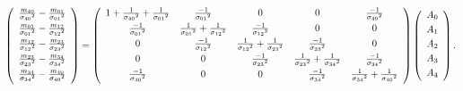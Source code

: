 \documentclass[12pt]{article}
\begin{document}
\begin{equation}
\left(\begin{array}{c}
\frac{m_{40}}{{\sigma_{40}}^2} - \frac{m_{01}}{{\sigma_{01}}^2} \vspace{0.1 cm} \\
\frac{m_{01}}{{\sigma_{01}}^2} - \frac{m_{12}}{{\sigma_{12}}^2} \vspace{0.1 cm} \\
\frac{m_{12}}{{\sigma_{12}}^2} - \frac{m_{23}}{{\sigma_{23}}^2} \vspace{0.1 cm} \\
\frac{m_{23}}{{\sigma_{23}}^2} - \frac{m_{34}}{{\sigma_{34}}^2} \vspace{0.1 cm} \\
\frac{m_{34}}{{\sigma_{34}}^2} - \frac{m_{40}}{{\sigma_{40}}^2} \vspace{0.1 cm} \\
\end{array}\right) = \left(\begin{array}{c c c c c}
1 + \frac{1}{{\sigma_{40}}^2} + \frac{1}{{\sigma_{01}}^2} & \frac{-1}{{\sigma_{01}}^2} & 0 & 0 & \frac{-1}{{\sigma_{40}}^2} \vspace{0.1 cm} \\
\frac{-1}{{\sigma_{01}}^2} & \frac{1}{{\sigma_{01}}^2} + \frac{1}{{\sigma_{12}}^2} & \frac{-1}{{\sigma_{12}}^2} & 0 & 0 \vspace{0.1 cm} \\
0 & \frac{-1}{{\sigma_{12}}^2} & \frac{1}{{\sigma_{12}}^2} + \frac{1}{{\sigma_{23}}^2} & \frac{-1}{{\sigma_{23}}^2} & 0 \vspace{0.1 cm} \\
0 & 0 & \frac{-1}{{\sigma_{23}}^2} & \frac{1}{{\sigma_{23}}^2} + \frac{1}{{\sigma_{34}}^2} & \frac{-1}{{\sigma_{34}}^2} \vspace{0.1 cm} \\
\frac{-1}{{\sigma_{40}}^2} & 0 & 0 & \frac{-1}{{\sigma_{34}}^2} & \frac{1}{{\sigma_{34}}^2} + \frac{1}{{\sigma_{40}}^2} \vspace{0.1 cm} \\
\end{array}\right) \left(\begin{array}{c}
A_0 \vspace{0.1 cm} \\
A_1 \vspace{0.1 cm} \\
A_2 \vspace{0.1 cm} \\
A_3 \vspace{0.1 cm} \\
A_4 \vspace{0.1 cm} \\
\end{array}\right).
\label{eqn:propagating_example4}
\end{equation}
\end{document}
